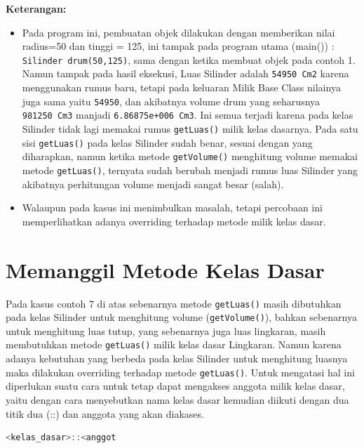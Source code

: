 \textbf{Keterangan:}

\begin{itemize}

\item
  Pada program ini, pembuatan objek dilakukan dengan memberikan nilai
  radius=50 dan tinggi = 125, ini tampak pada program utama (main()) :
  \texttt{Silinder\ drum(50,125)}, sama dengan ketika membuat objek pada
  contoh 1. Namun tampak pada hasil eksekusi, Luas Silinder adalah
  \texttt{54950\ Cm2} karena menggunakan rumus baru, tetapi pada
  keluaran Milik Base Class nilainya juga sama yaitu \texttt{54950}, dan
  akibatnya volume drum yang seharusnya \texttt{981250\ Cm3} manjadi
  \texttt{6.86875e+006\ Cm3}. Ini semua terjadi karena pada kelas
  Silinder tidak lagi memakai rumus \texttt{getLuas()} milik kelas
  dasarnya. Pada satu sisi \texttt{getLuas()} pada kelas Silinder sudah
  benar, sesuai dengan yang diharapkan, namun ketika metode
  \texttt{getVolume()} menghitung volume memakai metode
  \texttt{getLuas()}, ternyata sudah berubah menjadi rumus luas Silinder
  yang akibatnya perhitungan volume menjadi sangat besar (salah).
\item
  Walaupun pada kasus ini menimbulkan masalah, tetapi percobaan ini
  memperlihatkan adanya overriding terhadap metode milik kelas dasar.
\end{itemize}

\section{Memanggil Metode Kelas
Dasar}\label{memanggil-metode-kelas-dasar}

Pada kasus contoh 7 di atas sebenarnya metode \texttt{getLuas()} masih
dibutuhkan pada kelas Silinder untuk menghitung volume
(\texttt{getVolume()}), bahkan sebenarnya untuk menghitung luas tutup,
yang sebenarnya juga luas lingkaran, masih membutuhkan metode
\texttt{getLuas()} milik kelas dasar Lingkaran. Namun karena adanya
kebutuhan yang berbeda pada kelas Silinder untuk menghitung luasnya maka
dilakukan overriding terhadap metode \texttt{getLuas()}. Untuk mengatasi
hal ini diperlukan suatu cara untuk tetap dapat mengakses anggota milik
kelas dasar, yaitu dengan cara menyebutkan nama kelas dasar kemudian
diikuti dengan dua titik dua (::) dan anggota yang akan diakases.

\begin{lstlisting}[language=c++, numbers=none]
<kelas_dasar>::<anggot
\end{lstlisting}

